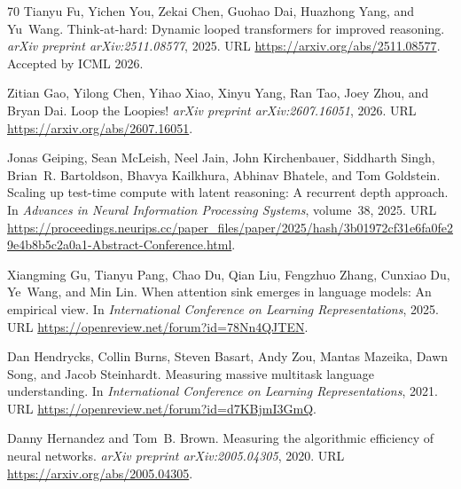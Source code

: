 \documentclass[]{bytedance_seed}
\theoremstyle{definition}
\theoremstyle{remark}
\begin{document}
\begin{thebibliography}{70}
Tianyu Fu, Yichen You, Zekai Chen, Guohao Dai, Huazhong Yang, and Yu~Wang.
\newblock Think-at-hard: Dynamic looped transformers for improved reasoning.
\newblock \emph{arXiv preprint arXiv:2511.08577}, 2025.
\newblock URL \url{https://arxiv.org/abs/2511.08577}.
\newblock Accepted by ICML 2026.

Zitian Gao, Yilong Chen, Yihao Xiao, Xinyu Yang, Ran Tao, Joey Zhou, and Bryan
  Dai.
\newblock Loop the {L}oopies!
\newblock \emph{arXiv preprint arXiv:2607.16051}, 2026.
\newblock URL \url{https://arxiv.org/abs/2607.16051}.

Jonas Geiping, Sean McLeish, Neel Jain, John Kirchenbauer, Siddharth Singh,
  Brian~R. Bartoldson, Bhavya Kailkhura, Abhinav Bhatele, and Tom Goldstein.
\newblock Scaling up test-time compute with latent reasoning: A recurrent depth
  approach.
\newblock In \emph{Advances in Neural Information Processing Systems},
  volume~38, 2025.
\newblock URL
  \url{https://proceedings.neurips.cc/paper_files/paper/2025/hash/3b01972cf31e6fa0fe29e4b8b5c2a0a1-Abstract-Conference.html}.

Xiangming Gu, Tianyu Pang, Chao Du, Qian Liu, Fengzhuo Zhang, Cunxiao Du,
  Ye~Wang, and Min Lin.
\newblock When attention sink emerges in language models: An empirical view.
\newblock In \emph{International Conference on Learning Representations}, 2025.
\newblock URL \url{https://openreview.net/forum?id=78Nn4QJTEN}.

Dan Hendrycks, Collin Burns, Steven Basart, Andy Zou, Mantas Mazeika, Dawn
  Song, and Jacob Steinhardt.
\newblock Measuring massive multitask language understanding.
\newblock In \emph{International Conference on Learning Representations}, 2021.
\newblock URL \url{https://openreview.net/forum?id=d7KBjmI3GmQ}.

Danny Hernandez and Tom~B. Brown.
\newblock Measuring the algorithmic efficiency of neural networks.
\newblock \emph{arXiv preprint arXiv:2005.04305}, 2020.
\newblock URL \url{https://arxiv.org/abs/2005.04305}.


\end{thebibliography}
\end{document}
